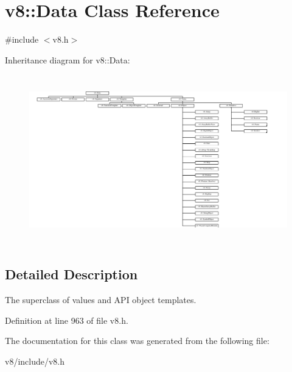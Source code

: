 \hypertarget{classv8_1_1Data}{}\section{v8\+:\+:Data Class Reference}
\label{classv8_1_1Data}


{\ttfamily \#include $<$v8.\+h$>$}

Inheritance diagram for v8\+:\+:Data\+:\begin{figure}[H]
\begin{center}
\leavevmode
\includegraphics[height=7.377245cm]{classv8_1_1Data}
\end{center}
\end{figure}


\subsection{Detailed Description}
The superclass of values and A\+PI object templates. 

Definition at line 963 of file v8.\+h.



The documentation for this class was generated from the following file\+:\begin{DoxyCompactItemize}
\item 
v8/include/v8.\+h\end{DoxyCompactItemize}
